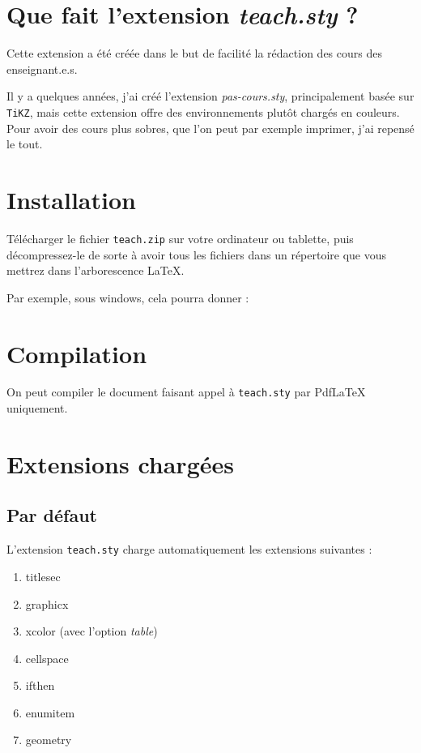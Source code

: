 \documentclass[12pt,a4paper,openany]{book}
\begin{document}
\section{Que fait l'extension \textit{teach.sty} ?}

Cette extension a été créée dans le but de facilité la rédaction des cours des enseignant.e.s.

Il y a quelques années, j'ai créé l'extension \textit{pas-cours.sty}, principalement basée sur \texttt{TiKZ}, mais cette extension offre des environnements plutôt chargés en couleurs. Pour avoir des cours plus sobres, que l'on peut par exemple imprimer, j'ai repensé le tout.

\section{Installation}

Télécharger le fichier \texttt{teach.zip} sur votre ordinateur ou tablette, puis décompressez-le de sorte à avoir tous les fichiers dans un répertoire que vous mettrez dans l'arborescence \LaTeX.

\medskip

Par exemple, sous windows, cela pourra donner :

\medskip


\section{Compilation}

On peut compiler le document faisant appel à \texttt{teach.sty} par PdfLaTeX uniquement.

\section{Extensions chargées}

\subsection{Par défaut}

L'extension \texttt{teach.sty} charge automatiquement les extensions suivantes :
\begin{enumerate}
\item titlesec
\item graphicx
\item xcolor (avec l'option \textit{table})
\item cellspace
\item ifthen
\item enumitem
\item geometry
\end{enumerate}
\end{document}
